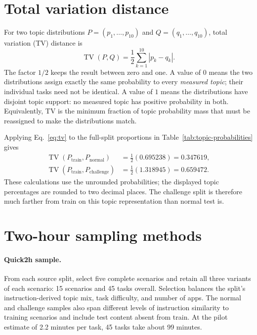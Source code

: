 \documentclass[11pt]{article}
\begin{document}
\section{Total variation distance}

For two topic distributions \(P=(p_1,\ldots,p_{10})\) and
\(Q=(q_1,\ldots,q_{10})\), total variation (TV) distance is
\begin{equation}
  \operatorname{TV}(P,Q)
  = \frac{1}{2}\sum_{k=1}^{10}|p_k-q_k|.
  \label{eq:tv}
\end{equation}
The factor \(1/2\) keeps the result between zero and one. A value of
\(0\) means the two distributions assign exactly the same probability to
every \emph{measured topic}; their individual tasks need not be identical.
A value of \(1\) means the distributions have disjoint topic support:
no measured topic has positive probability in both. Equivalently, TV is
the minimum fraction of topic probability mass that must be reassigned to
make the distributions match.

Applying Eq.~\eqref{eq:tv} to the full-split proportions in
Table~\ref{tab:topic-probabilities} gives
\begin{align}
  \operatorname{TV}(P_{\mathrm{train}},P_{\mathrm{normal}})
    &= \tfrac{1}{2}(0.695238)=\mathbf{0.347619}, \\
  \operatorname{TV}(P_{\mathrm{train}},P_{\mathrm{challenge}})
    &= \tfrac{1}{2}(1.318945)=\mathbf{0.659472}.
\end{align}
These calculations use the unrounded probabilities; the displayed topic
percentages are rounded to two decimal places. The challenge split is
therefore much farther from train on this topic representation than normal
test is.

\section{Two-hour sampling methods}

\paragraph{Quick2h sample.}
From each source split, select five complete scenarios and retain all three
variants of each scenario: 15 scenarios and 45 tasks overall. Selection
balances the split's instruction-derived topic mix, task difficulty, and number
of apps. The normal and challenge samples also span different levels of
instruction similarity to training scenarios and include test content absent
from train. At the pilot estimate of 2.2 minutes per task, 45 tasks take about
99 minutes.
\end{document}
